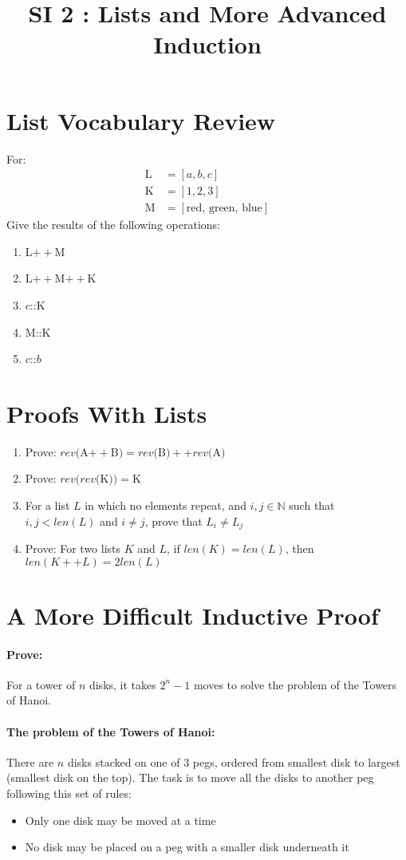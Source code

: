\documentclass[12pt]{article}
\title{SI 2 : Lists and More Advanced Induction}
\author{}
\date{}
\begin{document}
	\maketitle
	\section{List Vocabulary Review}
	For:
	\begin{align*}
		\text{L} &= [a,b,c]\\
		\text{K} &= [1,2,3]\\
		\text{M} &= [\text{red, green, blue}]
	\end{align*}
	Give the results of the following operations:
	\begin{enumerate}
		\item L$++$M
		\item L$++$M$++$K
		\item $c$::K
		\item M::K
		\item $c$::$b$
	\end{enumerate}
	\section{Proofs With Lists}
	\begin{enumerate}[resume]
		\item Prove: $rev($A$++$B$) = rev($B$)++rev($A$)$
		\item Prove: $rev(rev($K$))=$K
		\item For a list $L$ in which no elements repeat, and $i,j \in \mathbb{N}$ such that $i,j < len(L)$ and $i \neq j$, prove that $L_i \neq L_j$
		\item Prove: For two lists $K$ and $L$, if $len(K)=len(L)$, then $len(K++L) = 2len(L)$
	\end{enumerate}
	\section{A More Difficult Inductive Proof}
	\paragraph{Prove:} For a tower of $n$ disks, it takes $2^n-1$ moves to solve the problem of the Towers of Hanoi.\newline
	\paragraph{The problem of the Towers of Hanoi:} There are $n$ disks stacked on one of 3 pegs, ordered from smallest disk to largest (smallest disk on the top). The task is to move all the disks to another peg following this set of rules:
	\begin{itemize}
		\item Only one disk may be moved at a time
		\item No disk may be placed on a peg with a smaller disk underneath it
	\end{itemize}
\end{document}
